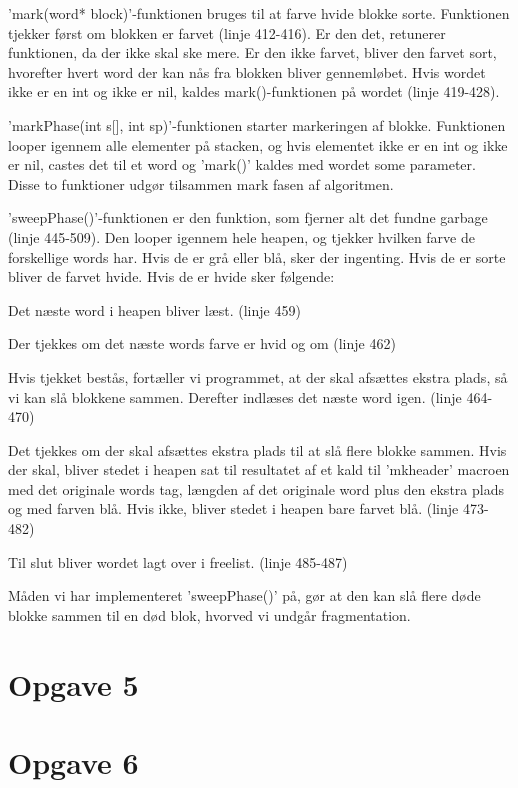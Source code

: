 'mark(word* block)'-funktionen bruges til at farve hvide blokke sorte. Funktionen tjekker først om blokken er farvet (linje 412-416). Er den det, retunerer funktionen, da der ikke skal ske mere. Er den ikke farvet, bliver den farvet sort, hvorefter hvert word der kan nås fra blokken bliver gennemløbet. Hvis wordet ikke er en int og ikke er nil, kaldes mark()-funktionen på wordet (linje 419-428).

'markPhase(int s[], int sp)'-funktionen starter markeringen af blokke. Funktionen looper igennem alle elementer på stacken, og hvis elementet ikke er en int og ikke er nil, castes det til et word og 'mark()' kaldes med wordet some parameter. Disse to funktioner udgør tilsammen mark fasen af algoritmen.

'sweepPhase()'-funktionen er den funktion, som fjerner alt det fundne garbage (linje 445-509). Den looper igennem hele heapen, og tjekker hvilken farve de forskellige words har. Hvis de er grå eller blå, sker der ingenting. Hvis de er sorte bliver de farvet hvide. Hvis de er hvide sker følgende:
\begin{my_enumerate}
	\item Det næste word i heapen bliver læst. (linje 459)
	\item Der tjekkes om det næste words farve er hvid og om (linje 462) %
	\item Hvis tjekket bestås, fortæller vi programmet, at der skal afsættes ekstra plads, så vi kan slå blokkene sammen. Derefter indlæses det næste word igen. (linje 464-470)
	\item Det tjekkes om der skal afsættes ekstra plads til at slå flere blokke sammen. Hvis der skal, bliver stedet i heapen sat til resultatet af et kald til 'mkheader' macroen med det originale words tag, længden af det originale word plus den ekstra plads og med farven blå. Hvis ikke, bliver stedet i heapen bare farvet blå. (linje 473-482)
	\item Til slut bliver wordet lagt over i freelist. (linje 485-487)
\end{my_enumerate}

Måden vi har implementeret 'sweepPhase()' på, gør at den kan slå flere døde blokke sammen til en død blok, hvorved vi undgår fragmentation.

\section{Opgave 5}
\label{O5}

\section{Opgave 6}
\label{O6}
